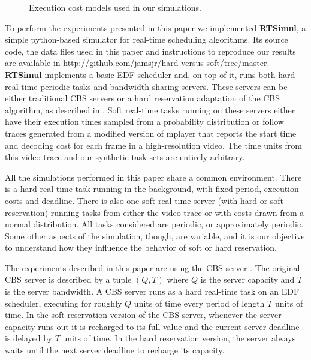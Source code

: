 \documentclass[times, 10pt,twocolumn]{article}
\newcommand{\simul}{\textbf{RTSimul}} %
\begin{document}
\begin{figure*}[t]
  \centering
  \caption{Execution cost models used in our simulations.}
\end{figure*}

\label{sec:simul-envir}

To perform the experiments presented in this paper we implemented
\simul{}, a simple python-based simulator for real-time scheduling
algorithms. Its source code, the data files used in this paper and
instructions to reproduce our results are available in
\url{http://github.com/jamsjr/hard-versus-soft/tree/master}. \simul{}
implements a basic EDF scheduler and, on top of it, runs both hard
real-time periodic tasks and bandwidth sharing servers. These servers
can be either traditional CBS servers \cite{abeni.ea98:integrating} or
a hard reservation adaptation of the CBS algorithm, as described in
\cite{buttazzo05:soft}. Soft real-time tasks running on these servers
either have their execution times sampled from a probability
distribution or follow traces generated from a modified version of
mplayer that reports the start time and decoding cost for each frame
in a high-resolution video. The time units from this video trace and
our synthetic task sets are entirely arbitrary.

All the simulations performed in this paper share a common
environment. There is a hard real-time task running in the background,
with fixed period, execution costs and deadline. There is also one
soft real-time server (with hard or soft reservation) running tasks
from either the video trace or with costs drawn from a normal
distribution. All tasks considered are periodic, or approximately
periodic. Some other aspects of the simulation, though, are variable,
and it is our objective to understand how they influence the behavior
of soft or hard reservation.


\label{sec:reserv-mech}

The experiments described in this paper are using the CBS server
\cite{abeni.ea98:integrating}. The original CBS server is described by
a tuple $(Q,T)$ where $Q$ is the server capacity and $T$ is the server
bandwidth. A CBS server runs as a hard real-time task on an EDF
scheduler, executing for roughly $Q$ units of time every period of
length $T$ units of time. In the soft reservation version of the CBS
server, whenever the server capacity runs out it is recharged to its
full value and the current server deadline is delayed by $T$ units of
time. In the hard reservation version, the server always waits until
the next server deadline to recharge its capacity.
\end{document}
